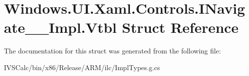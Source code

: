 \hypertarget{struct_windows_1_1_u_i_1_1_xaml_1_1_controls_1_1_i_navigate_____impl_1_1_vtbl}{}\section{Windows.\+U\+I.\+Xaml.\+Controls.\+I\+Navigate\+\_\+\+\_\+\+Impl.\+Vtbl Struct Reference}
\label{struct_windows_1_1_u_i_1_1_xaml_1_1_controls_1_1_i_navigate_____impl_1_1_vtbl}


The documentation for this struct was generated from the following file\+:\begin{DoxyCompactItemize}
\item 
I\+V\+S\+Calc/bin/x86/\+Release/\+A\+R\+M/ilc/Impl\+Types.\+g.\+cs\end{DoxyCompactItemize}
